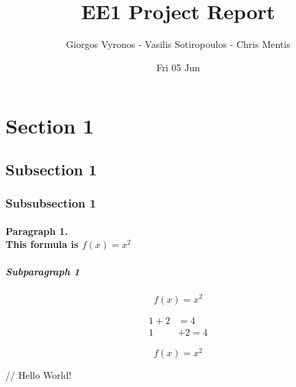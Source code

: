 \documentclass{report}
\title{EE1 Project Report}
\date{Fri 05 Jun}
\author{Giorgos Vyronos - Vasilis Sotiropoulos - Chris Mentis}
\begin{document}
	
	\maketitle
	\newpage

	\tableofcontents
	\newpage
	
	\section
	{Section 1}
	
	\subsection
	{Subsection 1}
	
	\subsubsection
	{Subsubsection 1}
	
	\paragraph
	{Paragraph 1.\\ This formula is $f(x)=x^2$}
	
	\subparagraph
	{Subparagraph 1}	
	
	\begin{equation}
	f(x)=x^2
	\end{equation}
	
	\begin{align}
	1+2&=4\\
	1&+2=4
	\end{align}
	
	\begin{equation*}	
	f(x)=x^2
	\end{equation*}
	
	\newpage
	// Hello World!
	
	
\end{document}
